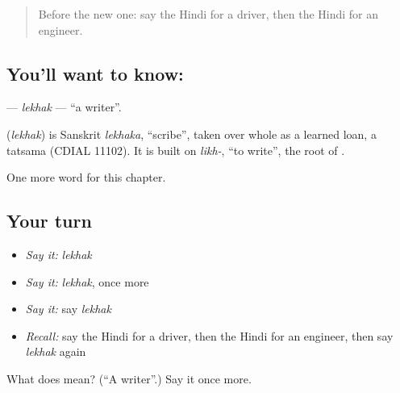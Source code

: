 \label{lesson:HI-C194-lekhak}



\begin{quote}
Before the new one: say the Hindi for a driver, then the Hindi for an engineer.
\end{quote}

\subsection*{You'll want to know: }
\textbf{} — \emph{lekhak} — \textquotedblleft{}a writer\textquotedblright{}.

\begin{cousinweb}
\textbf{} (\emph{lekhak}) is Sanskrit \emph{lekhaka}, \textquotedblleft{}scribe\textquotedblright{}, taken over whole as a learned loan, a tatsama (CDIAL 11102). It is built on \emph{likh-}, \textquotedblleft{}to write\textquotedblright{}, the root of \textbf{}.
\end{cousinweb}

\begin{grammarlens}[title={What you've built}]
One more word for this chapter.
\end{grammarlens}

\subsection*{Your turn}
\begin{itemize}
\raggedright
  \item \emph{Say it:} \emph{lekhak}
  \item \emph{Say it:} \emph{lekhak}, once more
  \item \emph{Say it:} say \emph{lekhak}
  \item \emph{Recall:} say the Hindi for a driver, then the Hindi for an engineer, then say \emph{lekhak} again
\end{itemize}

\begin{tcolorbox}[breakable,colback=teal!4,colframe=teal!35!black,title={Before you move on}]
What does  mean? (\textquotedblleft{}A writer\textquotedblright{}.) Say it once more.
\end{tcolorbox}

